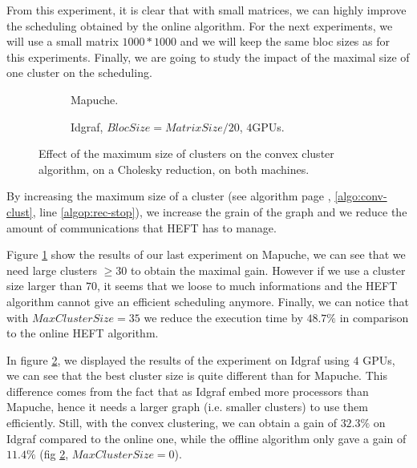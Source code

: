 \documentclass[10pt, conference, compsocconf,pdftex,dvipsnames]{IEEEtran}
\begin{document}
From this experiment, it is clear that with small matrices, we can highly
improve the scheduling obtained by the online algorithm. For the next
experiments, we will use a small matrix $1000*1000$ and we will keep the same
bloc sizes as for this experiments. Finally, we are going to study the impact
of the maximal size of one cluster on the scheduling.

\begin{figure}[tb]
    \centering
    \begin{subfigure}{0.4\textwidth}
        \hspace{-20pt}
        \scalebox{0.7}{
            
        }
        \caption{Mapuche.}
        \label{fig:ClustersMapuche}
    \end{subfigure}
    \hspace{15pt}
    \begin{subfigure}{0.55\textwidth}
        \scalebox{0.7}{
            
        }
        \caption{Idgraf, $BlocSize=MatrixSize/20$, $4$GPUs.}
        \label{fig:ClustersIdgraf}
    \end{subfigure}

    \caption{Effect of the maximum size of clusters on the convex cluster
    algorithm, on a Cholesky reduction, on both machines.}
    \label{fig:Clusters}
\end{figure}

By increasing the maximum size of a cluster (see algorithm
page \pageref{algo:conv-clust}, \ref{algo:conv-clust}, line
\ref{algop:rec-stop}), we increase the grain of the graph and we reduce the
amount of communications that HEFT has to manage.

Figure \ref{fig:ClustersMapuche} show the results of our last experiment on
Mapuche, we can see that we need large clusters $\geq 30$ to obtain the maximal
gain. However if we use a cluster size larger than $70$, it seems that we
loose to much informations and the HEFT algorithm cannot give an efficient
scheduling anymore. Finally, we can notice that with $MaxClusterSize=35$ we
reduce the execution time by $48.7\%$ in comparison to the online HEFT
algorithm.

In figure \ref{fig:ClustersIdgraf}, we displayed the results of the
experiment on Idgraf using $4$ GPUs, we can see that the best cluster size is
quite different than for Mapuche. This difference comes from the fact that as
Idgraf embed more processors than Mapuche, hence it needs a larger graph (i.e.
smaller clusters) to use them efficiently. Still, with the convex clustering,
we can obtain a gain of $32.3\%$ on Idgraf compared to the online one, while
the offline algorithm only gave a gain of $11.4\%$ (fig
\ref{fig:ClustersIdgraf}, $MaxClusterSize=0$).
\end{document}
